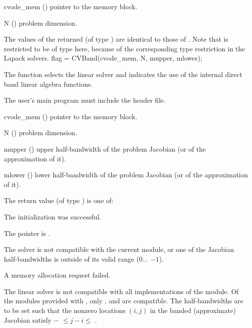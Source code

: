 {
  \begin{args}
  \item[cvode\_mem] ()
    pointer to the {\cvode} memory block.
  \item[N] ()
    problem dimension.
  \end{args}
}
{
  The values of the returned  (of type ) are identical
  to those of .
}
{
  Note that  is restricted to be of type  here, because
  of the corresponding type restriction in the Lapack solvers.
}
{
  flag = CVBand(cvode\_mem, N, mupper, mlower);
}
{
  The function  selects the {\cvband} linear solver and indicates
  the use of the internal direct band linear algebra functions.

  The user's main program must include the  header file.
}
{
  \begin{args}
  \item[cvode\_mem] ()
    pointer to the {\cvode} memory block.
  \item[N] ()
    problem dimension.
  \item[mupper] ()
    upper half-bandwidth of the problem Jacobian (or of the approximation of it).
  \item[mlower] ()
    lower half-bandwidth of the problem Jacobian (or of the approximation of it).
  \end{args}
}
{
  The return value  (of type ) is one of:
  \begin{args}
  \item[\Id{CVDLS\_SUCCESS}] 
    The {\cvband} initialization was successful.
  \item[\Id{CVDLS\_MEM\_NULL}]
    The  pointer is .
  \item[\Id{CVDLS\_ILL\_INPUT}]
    The {\cvband} solver is not compatible with the current {\nvector} module, or
    one of the Jacobian half-bandwidths is outside of its valid range
    ($0 \ldots$ $-1$).
  \item[\Id{CVDLS\_MEM\_FAIL}]
    A memory allocation request failed.
  \end{args}
}
{
  The {\cvband} linear solver is not compatible with all
  implementations of the {\nvector} module. 
  Of the {\nvector} modules provided with {\sundials}, only {\nvecs},
  {\nvecopenmp} and {\nvecpthreads} are compatible.
  The half-bandwidths are to be set such that the nonzero locations $(i,j)$ in the
  banded (approximate) Jacobian satisfy $-$ $\leq j-i \leq$ .
}
